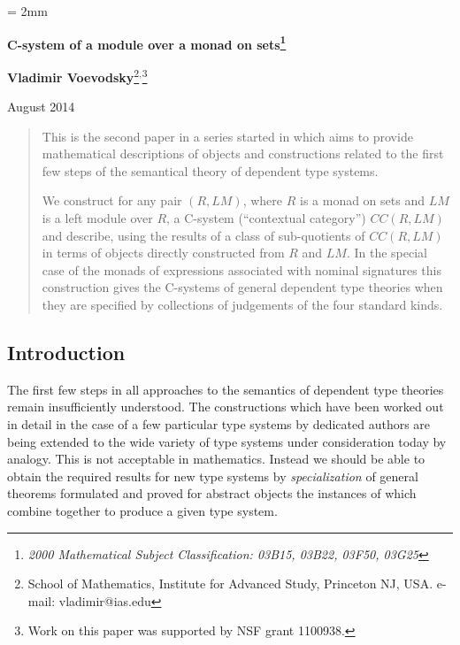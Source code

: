 \documentclass[11pt]{article}
\begin{document}
%
\parskip = 2mm
\begin{center}
{\bf\Large C-system of a module over a monad on sets\footnote{\em 2000 Mathematical Subject Classification: 03B15, 03B22, 03F50, 03G25}}

\vspace{3mm}

{\large\bf Vladimir Voevodsky}\footnote{School of Mathematics, Institute for Advanced Study,
Princeton NJ, USA. e-mail: vladimir@ias.edu}$^,$\footnote{Work on this paper was supported by NSF grant 1100938.}
\vspace {3mm}

{August 2014}  
\end{center}

\begin{abstract}
This is the second paper in a series started in \cite{Csubsystems} which aims to provide mathematical descriptions of objects and constructions related to the first few steps of the semantical theory of dependent type systems. 

We construct for any pair $(R,LM)$, where $R$ is a monad on sets and $LM$ is a left module over $R$, a C-system (``contextual category'') $CC(R,LM)$ and describe, using the results of \cite{Csubsystems} a class of sub-quotients of $CC(R,LM)$ in terms of objects directly constructed from $R$ and $LM$. In the special case of the monads of expressions associated with  nominal signatures this construction gives the C-systems of general dependent type theories when they are specified by collections of judgements of the four standard kinds.
\end{abstract}


\subsection{Introduction}

The first few steps in all approaches to the semantics of dependent type theories remain insufficiently understood. The constructions which have been worked out in detail in the case of a few particular type systems by dedicated authors are being extended to the wide variety of type systems under consideration today by analogy. This is not acceptable in mathematics. Instead we should be able to obtain the required results for new type systems by {\em specialization} of general theorems formulated and proved for abstract objects the instances of which combine together to produce a given type system. 
\end{document}
